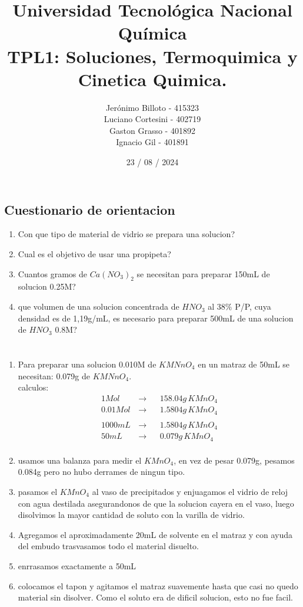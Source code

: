 \documentclass[12pt,a4paper]{report}
\title{%
  \fontsize{25}{0}\selectfont Universidad Tecnológica Nacional \\
  \fontsize{22}{30}\selectfont Química \\
  \fontsize{18}{25}\selectfont TPL1: Soluciones, Termoquimica y Cinetica Quimica.
}
\author{
  Jerónimo Billoto - 415323\\
  Luciano Cortesini - 402719\\
  Gaston Grasso - 401892\\
  Ignacio Gil - 401891\\
}
\date{23 / 08 / 2024}
\begin{document}
\maketitle
\section*{Cuestionario de orientacion}

\begin{enumerate}

  \item Con que tipo de material de vidrio se prepara una solucion?
  \item Cual es el objetivo de usar una propipeta?
  \item Cuantos gramos de $Ca(NO_3)_2$ se necesitan para preparar 150mL de solucion 0.25M?
  \item que volumen de  una solucion concentrada de $HNO_3$ al $38\% $ P/P, cuya densidad es de 1,19g/mL, es necesario para preparar 500mL de una solucion de $HNO_3$ 0.8M?
 
\end{enumerate}

\chapter{}

\begin{enumerate}[label=\alph*]

\item Para preparar una solucion 0.010M de $KMNnO_4$ en un matraz de 50mL se necesitan: 0.079g de $KMNnO_4$.\\
  
  
  calculos:
      $$
\begin{aligned}
   1 Mol  \, &\rightarrow&& 158.04g \,KMnO_4\\[6pt]
   0.01 Mol  \, &\rightarrow&& 1.5804g \,KMnO_4\\[6pt]
    \\
   1000mL \,  &\rightarrow&& 1.5804g \,KMnO_4  \\[6pt]
    50mL\,  &\rightarrow&& 0.079g \, KMnO_4\\[6pt]
\end{aligned}
$$

\item usamos una balanza para medir el $KMnO_4$, en vez de pesar 0.079g, pesamos 0.084g pero no hubo derrames de ningun tipo.
\item pasamos el $KMnO_4$ al vaso de precipitados y enjuagamos el vidrio de reloj con agua destilada asegurandonos de que la solucion cayera en el vaso, luego disolvimos la mayor cantidad de soluto con la varilla de vidrio.
\item Agregamos el aproximadamente 20mL de solvente en el matraz y con ayuda del embudo trasvasamos todo el material disuelto.
\item enrrasamos exactamente a 50mL
\item colocamos el tapon y agitamos el matraz suavemente hasta que casi no quedo material sin disolver. Como el soluto era de dificil solucion, esto no fue facil.

\end{enumerate}
 
\end{document}
